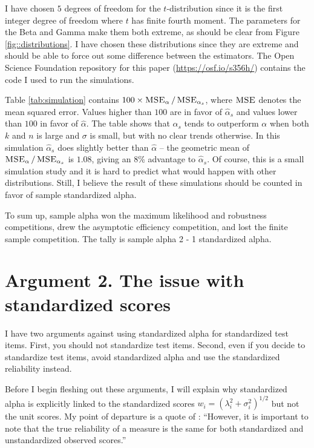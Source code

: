 \documentclass[twoside]{article}
\DeclareMathOperator{\MSE}{\textsc{MSE}}
\begin{document}
I have chosen $5$ degrees of freedom for the $t$-distribution since it is the first integer degree of freedom where $t$ has finite fourth moment. The parameters for the Beta and Gamma make them both extreme, as should be clear from Figure \ref{fig::distributions}. I have chosen these distributions since they are extreme and should be able to force out some difference between the estimators. The Open Science Foundation repository for this paper (\url{https://osf.io/s356h/}) contains the code I used to run the simulations.

Table \ref{tab:simulation} contains $100 \times \MSE_\alpha/\MSE_{\alpha_s}$, where $\MSE$ denotes the mean squared error. Values higher than $100$ are in favor of $\hat{\alpha}_s$ and values lower than $100$ in favor of $\hat{\alpha}$. The table shows that $\alpha_s$ tends to outperform $\alpha$ when both $k$ and $n$ is large and $\sigma$ is small, but with no clear trends otherwise. In this simulation $\hat{\alpha}_s$ does slightly better than $\hat{\alpha}$ -- the geometric mean of $\MSE_\alpha/\MSE_{\alpha_s}$ is $1.08$, giving an $8$\% advantage to $\hat{\alpha}_s$. Of course, this is a small simulation study and it is hard to predict what would happen with other distributions. Still, I believe the result of these simulations should be counted in favor of sample standardized alpha.

To sum up, sample alpha won the maximum likelihood and robustness competitions, drew the asymptotic efficiency competition, and lost the finite sample competition. The tally is sample alpha 2 - 1 standardized alpha. 



\section{Argument 2. The issue with standardized scores}
\label{sec:argument 2}
I have two arguments against using standardized alpha for standardized
test items. First, you should not standardize test items. Second,
even if you decide to standardize test items, avoid standardized
alpha and use the standardized reliability instead.

Before I begin fleshing out these arguments, I will explain why standardized alpha is explicitly linked to the standardized scores $w_i = {(\lambda_i^2 + \sigma_i^2)}^{1/2}$  but not the unit scores. My point of departure is a quote of \citet[][p.348]{Osburn2000-jd}: 
\enquote{However, it is important to note that the true reliability of a measure is the same for both standardized and unstandardized observed scores.}
\end{document}
